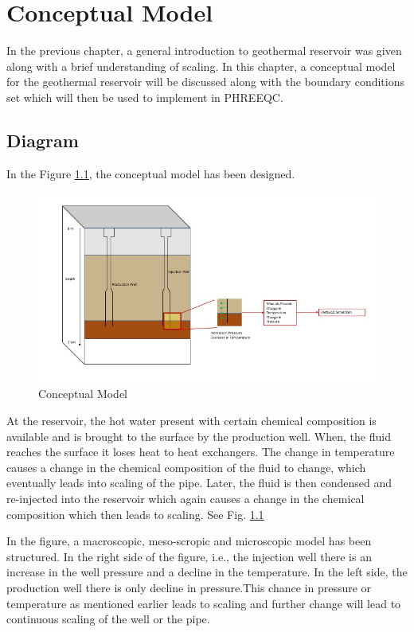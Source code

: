 \chapter{Conceptual Model}
In the previous chapter, a general introduction to geothermal reservoir was given along with a brief understanding of scaling. 
In this chapter, a conceptual model for the geothermal reservoir will be discussed along with the boundary conditions set which will then be used to implement in PHREEQC. 

\section{Diagram}

In the Figure \ref{fig:conc}, the conceptual model has been designed.
\begin{figure}[h]
    \centering
    \includegraphics[scale=0.7]{ConcModel.jpg}
    \caption{Conceptual Model}
    \label{fig:conc}
\end{figure}
At the reservoir, the hot water present with certain chemical composition is available and is brought to the surface by the production well. When, the fluid reaches the surface it loses heat to heat exchangers. The change in temperature causes a change in the chemical composition of the fluid to change, which eventually leads into scaling of the pipe. Later, the fluid is then condensed and re-injected into the reservoir which again causes a change in the chemical composition which then leads to scaling. See Fig.  \ref{fig:conc}

In the figure, a macroscopic, meso-scropic and microscopic model has been structured. In the right side of the figure, i.e., the injection well there is an increase in the well pressure and a decline in the temperature. In the left side, the production well there is only decline in pressure.This chance in pressure or temperature as mentioned earlier leads to scaling and further change will lead to continuous scaling of the well or the pipe. 

